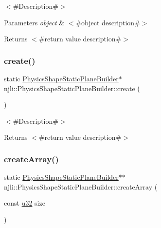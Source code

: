 $<$\#\+Description\#$>$


\begin{DoxyParams}{Parameters}
{\em object} & $<$\#object description\#$>$\\
\hline
\end{DoxyParams}
\begin{DoxyReturn}{Returns}
$<$\#return value description\#$>$ 
\end{DoxyReturn}
\mbox{\label{classnjli_1_1_physics_shape_static_plane_builder_a1185296ae0e95774278d3d7483db32ff}} 
\subsubsection{\texorpdfstring{create()}{create()}}
{\footnotesize\ttfamily static \mbox{\hyperlink{classnjli_1_1_physics_shape_static_plane_builder}{Physics\+Shape\+Static\+Plane\+Builder}}$\ast$ njli\+::\+Physics\+Shape\+Static\+Plane\+Builder\+::create (\begin{DoxyParamCaption}{ }\end{DoxyParamCaption})\hspace{0.3cm}{\ttfamily [static]}}

$<$\#\+Description\#$>$

\begin{DoxyReturn}{Returns}
$<$\#return value description\#$>$ 
\end{DoxyReturn}
\mbox{\label{classnjli_1_1_physics_shape_static_plane_builder_a48f63630dda6cf518e2b069a7047da83}} 
\subsubsection{\texorpdfstring{create\+Array()}{createArray()}}
{\footnotesize\ttfamily static \mbox{\hyperlink{classnjli_1_1_physics_shape_static_plane_builder}{Physics\+Shape\+Static\+Plane\+Builder}}$\ast$$\ast$ njli\+::\+Physics\+Shape\+Static\+Plane\+Builder\+::create\+Array (\begin{DoxyParamCaption}\item[{const \mbox{\hyperlink{_util_8h_a10e94b422ef0c20dcdec20d31a1f5049}{u32}}}]{size }\end{DoxyParamCaption})\hspace{0.3cm}{\ttfamily [static]}}


